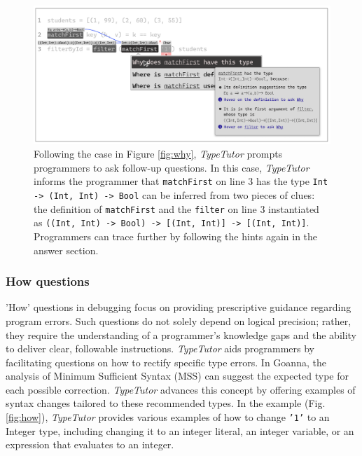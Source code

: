 \begin{figure}[hbt]
  \includegraphics[width=\linewidth]{FollowUp}
  \caption{
    \label{fig:follow-up}
     Following the case in Figure \ref{fig:why}, \textit{TypeTutor} prompts programmers to ask follow-up questions. In this case, \textit{TypeTutor} informs the programmer that \texttt{matchFirst} on line 3 has the type \texttt{Int -> (Int, Int) -> Bool} can be inferred from two pieces of clues:  the definition of \texttt{matchFirst} and the \texttt{filter} on line 3 instantiated as \texttt{((Int, Int) -> Bool) -> [(Int, Int)] -> [(Int, Int)]}. Programmers can trace further by following the hints again in the answer section.
    }
\end{figure}

\subsubsection{How questions}

'How' questions in debugging focus on providing prescriptive guidance regarding program errors. Such questions do not solely depend on logical precision; rather, they require the understanding of a programmer's knowledge gaps and the ability to deliver clear, followable instructions. \textit{TypeTutor} aids programmers by facilitating questions on how to rectify specific type errors. In Goanna, the analysis of Minimum Sufficient Syntax (MSS) can suggest the expected type for each possible correction. \textit{TypeTutor} advances this concept by offering examples of syntax changes tailored to these recommended types. In the example (Fig. \ref{fig:how}), \textit{TypeTutor} provides various examples of how to change \texttt{'1'} to an Integer type, including changing it to an integer literal, an integer variable, or an expression that evaluates to an integer. 



